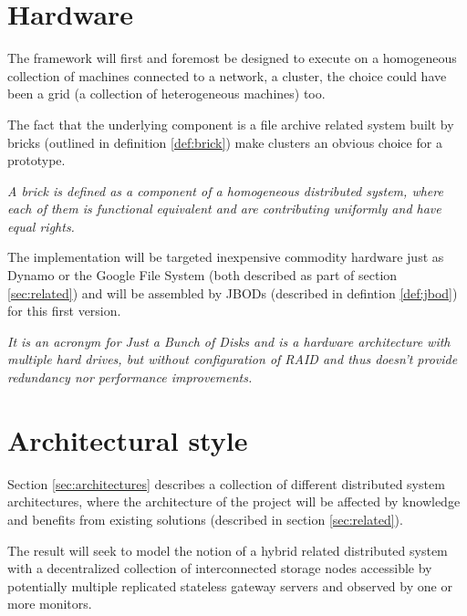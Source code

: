 \section{Hardware} \label{sec:hardware}
The framework will first and foremost be designed to execute on a homogeneous collection of machines connected to a network, \ie a cluster, the choice could have been a grid (a collection of heterogeneous machines) too. 

The fact that the underlying component is a file archive related system built by bricks (outlined in definition \ref{def:brick}) make clusters an obvious choice for a prototype.

\vspace*{3mm}
\begin{definition}[Brick] \label{def:brick}
\textit{A brick is defined as a component of a homogeneous distributed system, where each of them is functional equivalent and are contributing uniformly and have equal rights.}
\end{definition}
\vspace*{3mm}

The implementation will be targeted inexpensive commodity hardware just as \eg Dynamo or the Google File System (both described as part of section \ref{sec:related}) and will be assembled by JBODs (described in defintion \ref{def:jbod}) for this first version.

\vspace*{3mm}
\begin{definition}[JBOD] \label{def:jbod}
\textit{It is an acronym for Just a Bunch of Disks and is a hardware architecture with multiple hard drives, but without configuration of RAID and thus doesn't provide redundancy nor performance improvements.}
\end{definition}


\section{Architectural style} \label{sec:architectural-style}
Section \ref{sec:architectures} describes a collection of different distributed system architectures\cite{Tanenbaum:2006:DSP:1202502}, where the architecture of the project will be affected by knowledge and benefits from existing solutions (described in section \ref{sec:related}). 
\newline

The result will seek to model the notion of a hybrid related distributed system with a decentralized collection of interconnected storage nodes accessible by potentially multiple replicated stateless gateway servers and observed by one or more monitors.

